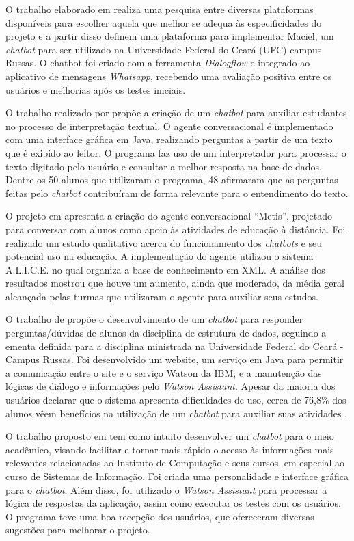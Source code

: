 \documentclass[12pt]{article}
\begin{document}
O trabalho elaborado em \cite{maciel:19} realiza uma pesquisa entre diversas plataformas disponíveis para escolher aquela que melhor se adequa às especificidades do projeto e a partir disso definem uma plataforma para implementar Maciel, um {\itshape chatbot} para ser utilizado na Universidade Federal do Ceará (UFC) campus Russas. O chatbot foi criado com a ferramenta {\itshape Dialogflow} e integrado ao aplicativo de mensagens {\itshape Whatsapp}, recebendo uma avaliação positiva entre os usuários e melhorias após os testes iniciais.

O trabalho realizado por \cite{bulhoes:20} propõe a criação de um {\itshape chatbot} para auxiliar estudantes no processo de interpretação textual. O agente conversacional é implementado com uma interface gráfica em Java, realizando perguntas a partir de um texto que é exibido ao leitor. O programa faz uso de um interpretador para processar o texto digitado pelo usuário e consultar a melhor resposta na base de dados. Dentre os 50 alunos que utilizaram o programa, 48 afirmaram que as perguntas feitas pelo {\itshape chatbot} contribuíram de forma relevante para o entendimento do texto.


O projeto em \cite{lucchesi:18} apresenta a criação do agente conversacional “Metis”, projetado para conversar com alunos como apoio às atividades de educação à distância. Foi realizado um estudo qualitativo acerca do funcionamento dos {\itshape chatbots} e seu potencial uso na educação. A implementação do agente utilizou o sistema A.L.I.C.E. no qual organiza a base de conhecimento em XML. A análise dos resultados mostrou que houve um aumento, ainda que moderado, da média geral alcançada pelas turmas que utilizaram o agente para auxiliar seus estudos.

O trabalho de \cite{araujo:20} propõe o desenvolvimento de um {\itshape chatbot} para responder perguntas/dúvidas de alunos da disciplina de estrutura de dados, seguindo a ementa definida para a disciplina ministrada na Universidade Federal do Ceará - Campus Russas. Foi desenvolvido um website, um serviço em Java para permitir a comunicação entre o site e o serviço Watson da IBM, e a manutenção das lógicas de diálogo e informações pelo {\itshape Watson Assistant}. Apesar da maioria dos usuários declarar que o sistema apresenta dificuldades de uso, cerca de 76,8\% dos alunos  vêem benefícios na utilização de um {\itshape chatbot} para auxiliar suas atividades   .

O trabalho proposto em \cite{catbot:19} tem como intuito desenvolver um {\itshape chatbot} para o meio acadêmico, visando facilitar e tornar mais rápido o acesso às informações mais relevantes relacionadas ao Instituto de Computação e seus cursos, em especial ao curso de Sistemas de Informação. Foi criada uma personalidade e interface gráfica para o {\itshape chatbot}. Além disso, foi utilizado o {\itshape Watson Assistant} para processar a lógica de respostas da aplicação, assim como executar os testes com os usuários. O programa teve uma boa recepção dos usuários, que ofereceram diversas sugestões para melhorar o projeto.
\end{document}
